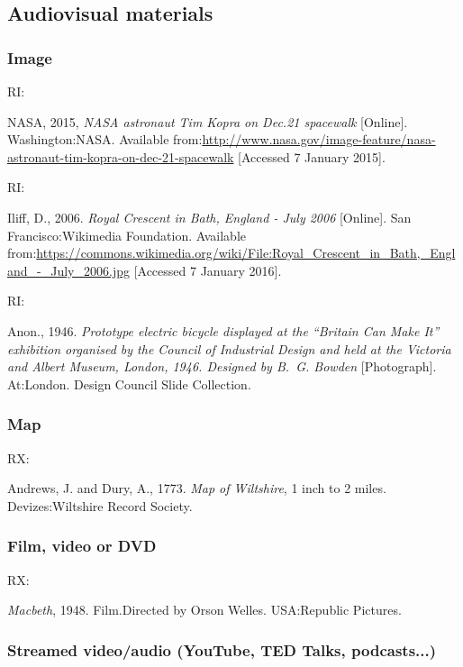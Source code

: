 \subsection{Audiovisual materials}

\subsubsection*{Image}

RI: \cite{nasa2015nat}

NASA, 2015, \emph{NASA astronaut Tim Kopra on Dec.\@ 21 spacewalk} [Online]. Washington:\@ NASA. Available from:\@ \url{http://www.nasa.gov/image-feature/nasa-astronaut-tim-kopra-on-dec-21-spacewalk} [Accessed 7 January 2015].


RI: \cite{iliff2006rcb}

Iliff, D., 2006. \emph{Royal Crescent in Bath, England - July 2006} [Online]. San Francisco:\@ Wikimedia Foundation. Available from:\@ \url{https://commons.wikimedia.org/wiki/File:Royal_Crescent_in_Bath,_England_-_July_2006.jpg} [Accessed 7 January 2016].


RI: \cite{anon1946peb}

Anon., 1946. \emph{Prototype electric bicycle displayed at the \enquote{Britain Can Make It} exhibition organised by the Council of Industrial Design and held at the Victoria and Albert Museum, London, 1946. Designed by B.~G. Bowden} [Photograph]. At:\@ London. Design Council Slide Collection.



\subsubsection*{Map}

RX: \cite{andrews.dury1773wilts}

Andrews, J. and Dury, A., 1773. \emph{Map of Wiltshire}, 1 inch to 2 miles. Devizes:\@ Wiltshire Record Society.



\subsubsection*{Film, video or DVD}

RX: \cite{macbeth1948}

\emph{Macbeth}, 1948. Film.\@ Directed by Orson Welles. USA:\@ Republic Pictures.



\subsubsection*{Streamed video/audio (YouTube, TED Talks, podcasts...)}

